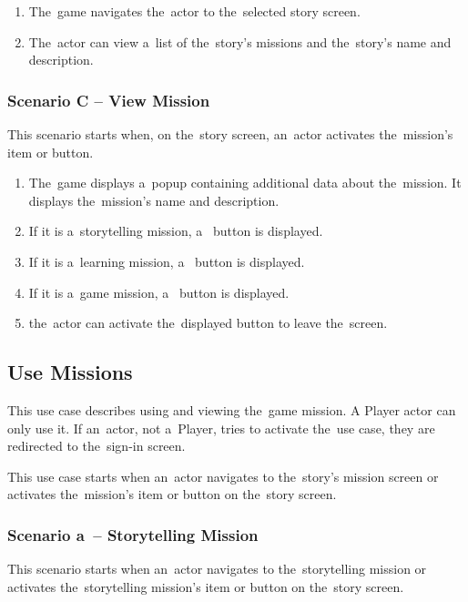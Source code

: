 \begin{enumerate}
    \item The~game navigates the~actor to the~selected story screen.
    \item The~actor can view a~list of the~story's missions and the~story's name and description.
\end{enumerate}

\subsubsection*{Scenario C -- View Mission}

This scenario starts when, on the~story screen, an~actor activates the~mission's item or button.

\begin{enumerate}
    \item The~game displays a~popup containing additional data about the~mission.
    It displays the~mission's name and description.
    \item If it is a~storytelling mission, a~ button is displayed.
    \item If it is a~learning mission, a~ button is displayed.
    \item If it is a~game mission, a~ button is displayed.
    \item the~actor can activate the~displayed button to leave the~screen.
\end{enumerate}

\pagebreak
\subsection{Use Missions}

This use case describes using and viewing the~game mission.
A Player actor can only use it.
If an~actor, not a~Player, tries to activate the~use case, they are redirected to the~sign-in screen.

This use case starts when an~actor navigates to the~story's mission screen or activates the~mission's item or button on the~story screen.

\subsubsection*{Scenario a~-- Storytelling Mission}

This scenario starts when an~actor navigates to the~storytelling mission or activates the~storytelling mission's item or button on the~story screen.

